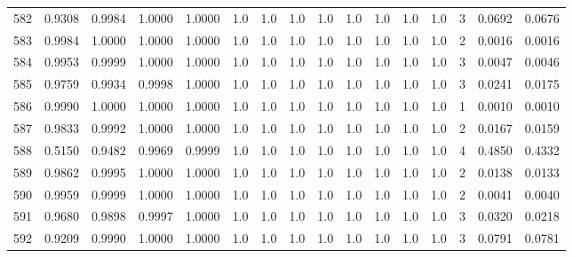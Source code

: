 \begin{tabular}{lrrrrrrrrrrrrrrr}
582 &      0.9308 &  0.9984 &  1.0000 &  1.0000 &     1.0 &     1.0 &     1.0 &     1.0 &     1.0 &     1.0 &      1.0 &        1.0 &      3 &                    0.0692 &                     0.0676 \\
583 &      0.9984 &  1.0000 &  1.0000 &  1.0000 &     1.0 &     1.0 &     1.0 &     1.0 &     1.0 &     1.0 &      1.0 &        1.0 &      2 &                    0.0016 &                     0.0016 \\
584 &      0.9953 &  0.9999 &  1.0000 &  1.0000 &     1.0 &     1.0 &     1.0 &     1.0 &     1.0 &     1.0 &      1.0 &        1.0 &      3 &                    0.0047 &                     0.0046 \\
585 &      0.9759 &  0.9934 &  0.9998 &  1.0000 &     1.0 &     1.0 &     1.0 &     1.0 &     1.0 &     1.0 &      1.0 &        1.0 &      3 &                    0.0241 &                     0.0175 \\
586 &      0.9990 &  1.0000 &  1.0000 &  1.0000 &     1.0 &     1.0 &     1.0 &     1.0 &     1.0 &     1.0 &      1.0 &        1.0 &      1 &                    0.0010 &                     0.0010 \\
587 &      0.9833 &  0.9992 &  1.0000 &  1.0000 &     1.0 &     1.0 &     1.0 &     1.0 &     1.0 &     1.0 &      1.0 &        1.0 &      2 &                    0.0167 &                     0.0159 \\
588 &      0.5150 &  0.9482 &  0.9969 &  0.9999 &     1.0 &     1.0 &     1.0 &     1.0 &     1.0 &     1.0 &      1.0 &        1.0 &      4 &                    0.4850 &                     0.4332 \\
589 &      0.9862 &  0.9995 &  1.0000 &  1.0000 &     1.0 &     1.0 &     1.0 &     1.0 &     1.0 &     1.0 &      1.0 &        1.0 &      2 &                    0.0138 &                     0.0133 \\
590 &      0.9959 &  0.9999 &  1.0000 &  1.0000 &     1.0 &     1.0 &     1.0 &     1.0 &     1.0 &     1.0 &      1.0 &        1.0 &      2 &                    0.0041 &                     0.0040 \\
591 &      0.9680 &  0.9898 &  0.9997 &  1.0000 &     1.0 &     1.0 &     1.0 &     1.0 &     1.0 &     1.0 &      1.0 &        1.0 &      3 &                    0.0320 &                     0.0218 \\
592 &      0.9209 &  0.9990 &  1.0000 &  1.0000 &     1.0 &     1.0 &     1.0 &     1.0 &     1.0 &     1.0 &      1.0 &        1.0 &      3 &                    0.0791 &                     0.0781 \\

\end{tabular}
